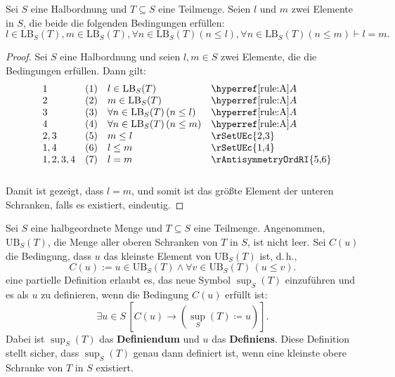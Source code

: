 \documentclass[main.tex]{subfiles}
\begin{document}
\label{lInLBwmInLBwFanInLBLpnLeqlRpwFanInLBLpnLeqmRpImplEqualsm}
\begin{theorem}
    Sei \( S \) eine Halbordnung und \( T \subseteq S \) eine Teilmenge. Seien \( l \) und \( m \) zwei Elemente in \( S \), die beide die folgenden Bedingungen erfüllen:
    \[
    l \in \text{LB}_S(T), m \in \text{LB}_S(T), \forall n \in \text{LB}_S(T) (n \leq l), \forall n \in \text{LB}_S(T) (n \leq m) \vdash l = m.
    \]
\end{theorem}

\begin{proof}
    Sei \( S \) eine Halbordnung und seien \( l, m \in S \) zwei Elemente, die die Bedingungen erfüllen. Dann gilt:
    \[
    \begin{array}{lll p{4cm}}
        1 & (1) & l \in \text{LB}_S(T) & \rA \\
        2 & (2) & m \in \text{LB}_S(T) & \rA \\
        3 & (3) & \forall n \in \text{LB}_S(T) \, (n \leq l) & \rA \\
        4 & (4) & \forall n \in \text{LB}_S(T) \, (n \leq m) & \rA \\
        2,3 & (5) & m \leq l & \rSetUEc{2,3}  \\
        1,4 & (6) & l \leq m & \rSetUEc{1,4} \\
        1,2,3,4 & (7) & l = m & \rAntisymmetryOrdRI{5,6} \\
    \end{array}
    \]
    Damit ist gezeigt, dass \( l = m \), und somit ist das größte Element der unteren Schranken, falls es existiert, eindeutig.
\end{proof}


\begin{definition}[Supremum]
    Sei \( S \) eine halbgeordnete Menge und \( T \subseteq S \) eine Teilmenge. Angenommen, \(\text{UB}_S(T)\), die Menge aller oberen Schranken von \( T \) in \( S \), ist nicht leer. Sei \( C(u) \) die Bedingung, dass \( u \) das kleinste Element von \(\text{UB}_S(T)\) ist, d.\,h.,
    \[
    C(u) := u \in \text{UB}_S(T) \land \forall v \in \text{UB}_S(T) \, (u \leq v).
    \]
    eine partielle Definition erlaubt es, das neue Symbol \(\sup_S(T)\) einzuführen und es als \( u \) zu definieren, wenn die Bedingung \( C(u) \) erfüllt ist:
    \[
    \exists u \in S \, [ C(u) \rightarrow (\sup_S(T) \coloneqq u) ].
    \]
    Dabei ist \(\sup_S(T)\) das \textbf{Definiendum} und \( u \) das \textbf{Definiens}. Diese Definition stellt sicher, dass \(\sup_S(T)\) genau dann definiert ist, wenn eine kleinste obere Schranke von \( T \) in \( S \) existiert.
\end{definition}
\end{document}
